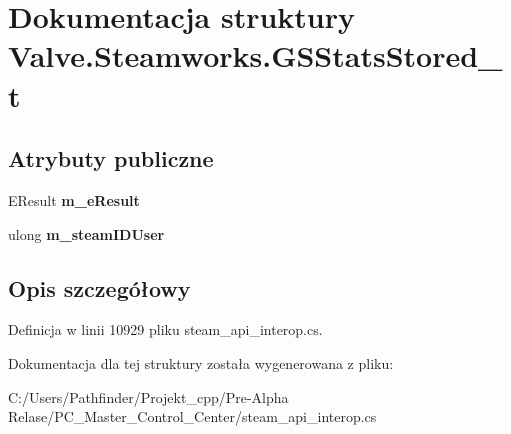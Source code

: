 \hypertarget{struct_valve_1_1_steamworks_1_1_g_s_stats_stored__t}{}\section{Dokumentacja struktury Valve.\+Steamworks.\+G\+S\+Stats\+Stored\+\_\+t}
\label{struct_valve_1_1_steamworks_1_1_g_s_stats_stored__t}
\subsection*{Atrybuty publiczne}
\begin{DoxyCompactItemize}
\item 
\mbox{\label{struct_valve_1_1_steamworks_1_1_g_s_stats_stored__t_af09fa5c499c76d9e15fe44428dd4cf22}} 
E\+Result {\bfseries m\+\_\+e\+Result}
\item 
\mbox{\label{struct_valve_1_1_steamworks_1_1_g_s_stats_stored__t_ad581819292d8f0eb04996f680f4e4b81}} 
ulong {\bfseries m\+\_\+steam\+I\+D\+User}
\end{DoxyCompactItemize}


\subsection{Opis szczegółowy}


Definicja w linii 10929 pliku steam\+\_\+api\+\_\+interop.\+cs.



Dokumentacja dla tej struktury została wygenerowana z pliku\+:\begin{DoxyCompactItemize}
\item 
C\+:/\+Users/\+Pathfinder/\+Projekt\+\_\+cpp/\+Pre-\/\+Alpha Relase/\+P\+C\+\_\+\+Master\+\_\+\+Control\+\_\+\+Center/steam\+\_\+api\+\_\+interop.\+cs\end{DoxyCompactItemize}
